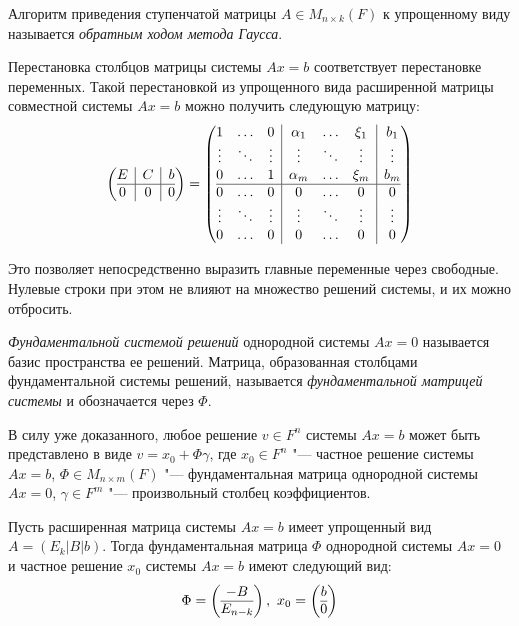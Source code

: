 \begin{definition}
	Алгоритм приведения ступенчатой матрицы $A \in M_{n \times k}(F)$ к упрощенному виду называется \textit{обратным ходом метода Гаусса}.
\end{definition}

\begin{note}
	Перестановка столбцов матрицы системы $Ax = b$ соответствует перестановке переменных. Такой перестановкой из упрощенного вида расширенной матрицы совместной системы $Ax = b$ можно получить следующую матрицу:
	\[
	\left(\begin{array}{@{}c|c|c@{}}
	E & C & b\\
	\hline
	0 & 0 & 0
	\end{array}\right)
	=
	\left(\begin{array}{@{}ccc|ccc|c@{}}
	1 & \dots & 0 & \alpha_1 & \dots & \xi_1 & b_1\\
	\vdots & \ddots & \vdots & \vdots & \ddots & \vdots & \vdots\\
	0 & \dots & 1 & \alpha_m &\dots & \xi_m & b_m\\
	\hline
	0 & \dots & 0 & 0 &\dots & 0 & 0\\
	\vdots & \ddots & \vdots & \vdots & \ddots & \vdots & \vdots\\
	0 & \dots & 0 & 0 &\dots & 0 & 0
	\end{array}\right)
	\]
	
	Это позволяет непосредственно выразить главные переменные через свободные. Нулевые строки при этом не влияют на множество решений системы, и их можно отбросить.
\end{note}

\begin{definition}
	\textit{Фундаментальной системой решений} однородной системы $Ax = 0$ называется базис пространства ее решений. Матрица, образованная столбцами фундаментальной системы решений, называется \textit{фундаментальной матрицей системы} и обозначается через $\Phi$.
\end{definition}

\begin{note}
	В силу уже доказанного, любое решение $v \in F^n$ системы $Ax = b$ может быть представлено в виде $v = x_0 + \Phi\gamma$, где $x_0 \in F^n$ "--- частное решение системы ${Ax=b}$, $\Phi \in M_{n \times m}(F)$ "--- фундаментальная матрица однородной системы $Ax = 0$, $\gamma \in F^m$ "--- произвольный столбец коэффициентов.
\end{note}

\begin{theorem}
	Пусть расширенная матрица системы $Ax = b$ имеет упрощенный вид $A = (E_k|B|b)$. Тогда фундаментальная матрица $\Phi$ однородной системы $Ax = 0$ и частное решение $x_0$ системы $Ax = b$ имеют следующий вид:
	\[\Phi = \left(\begin{array}{@{}c@{}}-B\\\hline E_{n - k}\end{array}\right),~
	x_0 = \left(\begin{array}{@{}c@{}}b\\\hline 0\end{array}\right)\]
\end{theorem}


